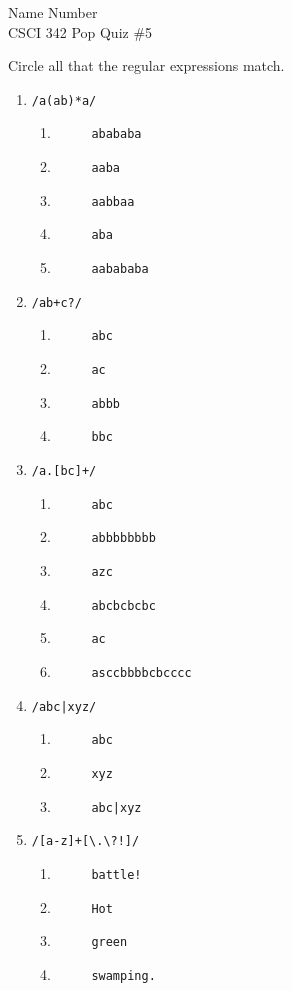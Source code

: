\documentclass{article}
\begin{document}
Name \hrulefill Number \hrulefill\\
CSCI 342 Pop Quiz \#5

Circle all that the regular expressions match.

\begin{multicols}{2}
\begin{enumerate} 
\item  \verb|/a(ab)*a/|
\begin{enumerate} 
\item \verb|     abababa|
\item \verb|     aaba|
\item \verb|     aabbaa|
\item \verb|     aba|
\item \verb|     aabababa|
\end{enumerate} 
\item  \verb|/ab+c?/|
\begin{enumerate}
\item \verb|     abc|
\item \verb|     ac|
\item \verb|     abbb|
\item \verb|     bbc|
\end{enumerate} 
\item  \verb|/a.[bc]+/|
 \begin{enumerate}
\item \verb|     abc|
\item \verb|     abbbbbbbb|
\item \verb|     azc|
\item \verb|     abcbcbcbc|
\item \verb|     ac|
\item \verb|     asccbbbbcbcccc|
\end{enumerate} 
\item  \verb./abc|xyz/.
 \begin{enumerate}
\item \verb|     abc|
\item \verb|     xyz|
\item \verb.     abc|xyz.
\end{enumerate} 
\item  \verb|/[a-z]+[\.\?!]/|
 \begin{enumerate}
\item \verb|     battle!|
\item \verb|     Hot|
\item \verb|     green|
\item \verb|     swamping.|

\end{enumerate}
\end{enumerate}
\end{multicols}
\end{document}
